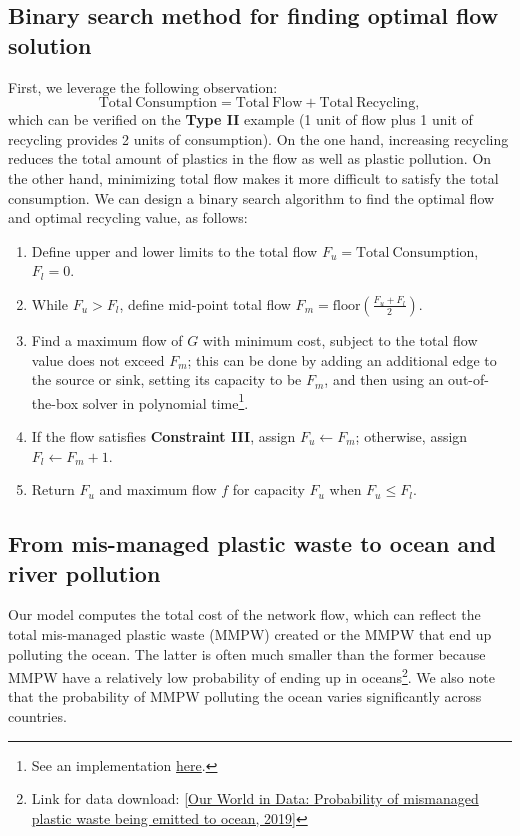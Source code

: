 \documentclass[dvipsnames]{article}
\begin{document}
\subsection{Binary search method for finding optimal flow solution}
\label{app:binsearch}
First, we leverage the following observation:
$$
\mathrm{Total\ Consumption} = \mathrm{Total\ Flow} + \mathrm{Total\ Recycling},
$$
which can be verified on the \textbf{Type II} example (1 unit of flow plus 1 unit of recycling provides 2 units of consumption). On the one hand, increasing recycling reduces the total amount of plastics in the flow as well as plastic pollution. On the other hand, minimizing total flow makes it more difficult to satisfy the total consumption. We can design a binary search algorithm to find the optimal flow and optimal recycling value, as follows:
\begin{enumerate}
    \item Define upper and lower limits to the total flow $F_u = \mathrm{Total\ Consumption}$, $F_l = 0$.
    \item While $F_u > F_l$, define mid-point total flow $F_m = \mathrm{floor}(\frac{F_u + F_l}{2})$.
    \item Find a maximum flow of $G$ with minimum cost, subject to the total flow value does not exceed $F_m$; this can be done by adding an additional edge to the source or sink, setting its capacity to be $F_m$, and then using an out-of-the-box solver in polynomial time\footnote{See an implementation  \href{https://networkx.org/documentation/stable/reference/algorithms/generated/networkx.algorithms.flow.max_flow_min_cost.html}{here}.}.
    \item If the flow satisfies \textbf{Constraint III}, assign $F_u \xleftarrow{} F_m$; otherwise, assign $F_l \xleftarrow{} F_m+1$.
    \item Return $F_u$ and maximum flow $f$ for capacity $F_u$ when $F_u \leq F_l$.
\end{enumerate}

\subsection{From mis-managed plastic waste to ocean and river pollution}
\label{app:rivers}
Our model computes the total cost of the network flow, which can reflect the total mis-managed plastic waste (MMPW) created or the MMPW that end up polluting the ocean. The latter is often much smaller than the former because MMPW have a relatively low probability of ending up in oceans\footnote{Link for data download: \href{https://ourworldindata.org/grapher/probability-mismanaged-plastic-ocean?country=MYS~PHL~CHN~IND~LKA~BRA~NGA~TZA}{[Our World in Data: Probability of mismanaged plastic waste being emitted to ocean, 2019]}}. We also note that the probability of MMPW polluting the ocean varies significantly across countries.
\end{document}

